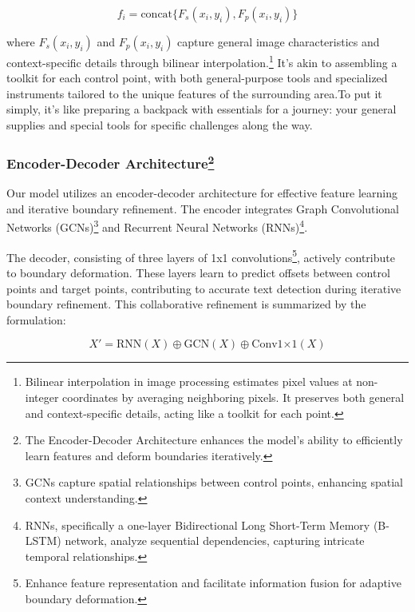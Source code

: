 \documentclass[default,iicol]{sn-jnl} %
\begin{document}
\begin{equation}
	f_i = \text{concat}\{F_s(x_i, y_i), F_p(x_i, y_i)\}
\end{equation}

where $F_s(x_i, y_i)$ and $F_p(x_i, y_i)$ capture general image characteristics and context-specific details through bilinear interpolation.\protect\footnote{Bilinear interpolation in image processing estimates pixel values at non-integer coordinates by averaging neighboring pixels. It preserves both general and context-specific details, acting like a toolkit for each point.} It's akin to assembling a toolkit for each control point, with both general-purpose tools and specialized instruments tailored to the unique features of the surrounding area.To put it simply, it's like preparing a backpack with essentials for a journey: your general supplies and special tools for specific challenges along the way.

\subsubsection*{Encoder-Decoder Architecture\protect\footnote{The Encoder-Decoder Architecture enhances the model's ability to efficiently learn features and deform boundaries iteratively.}}

Our model utilizes an encoder-decoder architecture for effective feature learning and iterative boundary refinement. The encoder integrates Graph Convolutional Networks (GCNs)\protect\footnote{GCNs capture spatial relationships between control points, enhancing spatial context understanding.} and Recurrent Neural Networks (RNNs)\protect\footnote{RNNs, specifically a one-layer Bidirectional Long Short-Term Memory (B-LSTM) network, analyze sequential dependencies, capturing intricate temporal relationships.}.

The decoder, consisting of three layers of 1x1 convolutions\protect\footnote{Enhance feature representation and facilitate information fusion for adaptive boundary deformation.}, actively contribute to boundary deformation. These layers learn to predict offsets between control points and target points, contributing to accurate text detection during iterative boundary refinement. This collaborative refinement is summarized by the formulation:

\begin{equation}
	X' = \text{{RNN}}(X) \oplus \text{{GCN}}(X) \oplus \text{{Conv1×1}}(X)
\end{equation}
\end{document}
